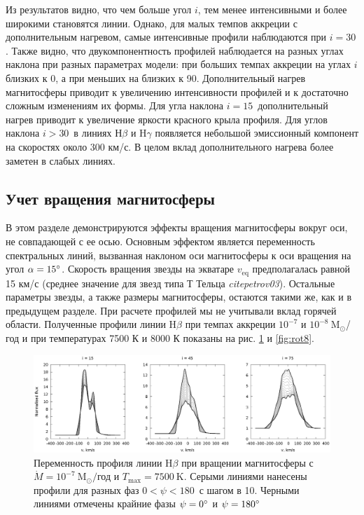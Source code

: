 \documentclass{article}
\begin{document}
Из результатов видно, что чем больше угол $i$, тем менее интенсивными и более широкими становятся линии. Однако, для малых темпов аккреции с дополнительным нагревом, самые интенсивные профили наблюдаются при $i=30$\degree. Также видно, что двукомпонентность профилей наблюдается на разных углах наклона при разных параметрах модели: при больших темпах аккреции на углах $i$ близких к 0\degree, а при меньших на близких к 90\degree. Дополнительный нагрев магнитосферы приводит к увеличению интенсивности профилей и к достаточно сложным изменениям их формы. Для угла наклона $i=15$\degree\ дополнительный нагрев приводит к увеличение яркости красного крыла профиля. Для углов наклона $i > 30$\degree\ в линиях Н$\beta$ и H$\gamma$ появляется небольшой эмиссионный компонент на скоростях около 300 км/с. В целом вклад дополнительного нагрева более заметен в слабых линиях. 

\subsection{Учет вращения магнитосферы}

В этом разделе демонстрируются эффекты вращения магнитосферы вокруг оси, не совпадающей с ее осью. Основным эффектом является переменность спектральных линий, вызванная наклоном оси магнитосферы к оси вращения на угол $\alpha = 15\text{\degree}$. Скорость вращения звезды на экватаре $v_\text{eq}$ предполагалась равной 15 км/с (среднее значение для звезд типа Т Тельца \textit{cite{petrov03}}). Остальные параметры звезды, а также размеры магнитосферы, остаются такими же, как и в предыдущем разделе. При расчете профилей мы не учитывали вклад горячей области. Полученные профили линии H$\beta$ при темпах аккреции $10^{-7}$ и $10^{-8}\ \text{M}_\odot$/год и при температурах 7500 К и 8000 К показаны на рис. \ref{fig:rot7} и \ref{fig:rot8}.

\begin{figure}[h]
\centering
\includegraphics[width=\textwidth]{rot_7.eps}
\caption{Переменность профиля линии H$\beta$ при вращении магнитосферы с $\dot{M} = 10^{-7}\ \text{M}_\odot/$год и $T_\text{max} = 7500\ \text{K}$. Серыми линиями нанесены профили для разных фаз $0$\degree$< \psi < 180$\degree\ с шагом в 10\degree. Черными линиями отмечены крайние фазы $\psi = 0\text{\degree}$ и $\psi = 180\text{\degree}$}
\label{fig:rot7}
\end{figure}
\end{document}
